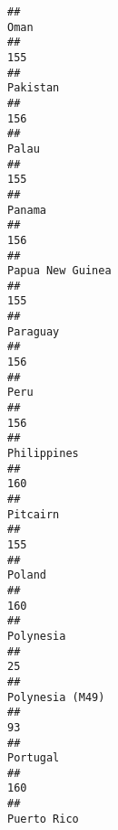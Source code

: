 \documentclass[]{article}
\begin{document}
\begin{verbatim}
##                                                                                         Oman 
##                                                                                          155 
##                                                                                     Pakistan 
##                                                                                          156 
##                                                                                        Palau 
##                                                                                          155 
##                                                                                       Panama 
##                                                                                          156 
##                                                                             Papua New Guinea 
##                                                                                          155 
##                                                                                     Paraguay 
##                                                                                          156 
##                                                                                         Peru 
##                                                                                          156 
##                                                                                  Philippines 
##                                                                                          160 
##                                                                                     Pitcairn 
##                                                                                          155 
##                                                                                       Poland 
##                                                                                          160 
##                                                                                    Polynesia 
##                                                                                           25 
##                                                                              Polynesia (M49) 
##                                                                                           93 
##                                                                                     Portugal 
##                                                                                          160 
##                                                                                  Puerto Rico 

\end{verbatim}
\end{document}
